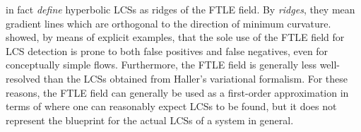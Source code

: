 \textcite{shadden2005definition} in fact \emph{define} hyperbolic LCSs as ridges
of the FTLE field. By \emph{ridges}, they mean gradient lines which are
orthogonal to the direction of minimum curvature.
\textcite{haller2010variational} showed, by means of explicit examples, that the
sole use of the FTLE field for LCS detection is prone to both false positives
and false negatives, even for conceptually simple flows. Furthermore, the FTLE
field is generally less well-resolved than the LCSs obtained from Haller's
variational formalism. For these reasons, the FTLE field can generally be used
as a first-order approximation in terms of where one can reasonably expect LCSs
to be found, but it does not represent the blueprint for the actual LCSs of a
system in general.
